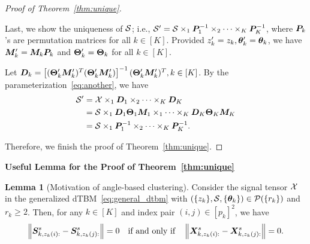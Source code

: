 \documentclass[lettersize,onecolumn,journal]{IEEEtran}
\theoremstyle{definition}
\newtheorem{lem}{Lemma}
\theoremstyle{definition}
\newcommand{\off}[1]{\left[#1\right]}
\begin{document}
\begin{proof}[Proof of Theorem~\ref{thm:unique}]
\begin{enumerate}[wide]
Last, we show the uniqueness of $\mathcal{S}$; i.e., $\mathcal{S}'=\mathcal{S}\times_1 \bm{P}^{-1}_1\times_2\cdots \times_K \bm{P}^{-1}_K$, where $\bm{P}_k$'s are permutation matrices for all $k\in[K]$.  Provided $z'_k = z_k, \boldsymbol{\theta}'_k = \boldsymbol{\theta}_k$, we have $\bm M'_k = \bm M_k \bm{P}_k$ and $\boldsymbol{\Theta}'_k = \boldsymbol{\Theta}_k$ for all $k \in [K]$. 

Let $\mD_k = \off{ (\mTheta'_k \mM'_k)^T (\mTheta'_k \mM'_k) }^{-1} (\mTheta'_k \mM'_k)^T, k \in [K]$. By the parameterization~\eqref{eq:another}, we have 
\begin{align}
    \mathcal{S}' &= \mathcal{X} \times_1 \bm{D}_1 \times_2 \cdots \times_K \bm{D}_K \\
    &= \mathcal{S} \times_1 \bm{D}_1 \boldsymbol{\Theta}_1 \bm M_1 \times_1 \cdots \times_K \bm{D}_K \boldsymbol{\Theta}_K \bm M_K \\
    &= \mathcal{S} \times_1 \bm{P}^{-1}_1 \times_2 \cdots \times_K \bm{P}^{-1}_K.
\end{align}


\end{enumerate}

Therefore, we finish the proof of Theorem~\ref{thm:unique}.
\end{proof}


{\bf Useful Lemma for the Proof of Theorem~\ref{thm:unique}} 

\begin{lem}[Motivation of angle-based clustering]\label{lem:angle} Consider the signal tensor $\mathcal{X}$ in the generalized dTBM~\eqref{eq:general_dtbm} with $(\{z_k\},\mathcal{S},\{\boldsymbol{\theta}_k\})\in \mathcal{P}(\{r_k\})$ and $r_k \geq 2$. Then, for any $k \in [K]$ and index pair $(i,j)\in[p_k]^2$, we have 
\begin{equation}
    \left\lVert \bm S_{k,z_k(i):}^s -  \bm S_{k,z_k(j):}^s \right\rVert = 0 \quad \text{if and only if} \quad \left\lVert  \bm X_{k, z_k(i):}^s -  \bm X_{k,z_k(j):}^s \right\rVert = 0.
\end{equation}
\end{lem}
\end{document}
